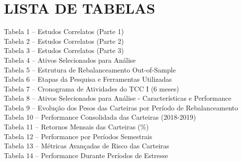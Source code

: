 
\chapter*{LISTA DE TABELAS}

\vspace{1cm}

\noindent
Tabela 1 -- Estudos Correlatos (Parte 1) \\
Tabela 2 -- Estudos Correlatos (Parte 2) \\
Tabela 3 -- Estudos Correlatos (Parte 3) \\
Tabela 4 -- Ativos Selecionados para Análise \\
Tabela 5 -- Estrutura de Rebalanceamento Out-of-Sample \\
Tabela 6 -- Etapas da Pesquisa e Ferramentas Utilizadas \\
Tabela 7 -- Cronograma de Atividades do TCC I (6 meses) \\
Tabela 8 -- Ativos Selecionados para Análise - Características e Performance \\
Tabela 9 -- Evolução dos Pesos das Carteiras por Período de Rebalanceamento \\
Tabela 10 -- Performance Consolidada das Carteiras (2018-2019) \\
Tabela 11 -- Retornos Mensais das Carteiras (\%) \\
Tabela 12 -- Performance por Períodos Semestrais \\
Tabela 13 -- Métricas Avançadas de Risco das Carteiras \\
Tabela 14 -- Performance Durante Períodos de Estresse 